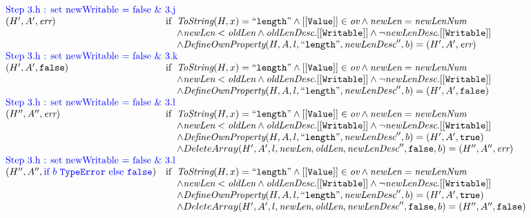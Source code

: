 \[\begin{array}{l@{}c}
{\begin{array}{ll}
\multicolumn{2}{l}{\mbox{\inblue Step 3.h : set newWritable = false \& 3.j}}\\
(H',A', \err)   &\ifc{\hf{ToString}(H, x) = ``{\tt length}" \wedge [[{\tt Value}]] \in \ov \wedge \hf{newLen} = \hf{newLenNum} \\
    \wedge \hf{newLen} < \hf{oldLen} \wedge \hf{oldLenDesc}.{\tt[[Writable]]} \wedge \neg\hf{newLenDesc}.{\tt[[Writable]]} \\
    \wedge \hf{DefineOwnProperty}(H, A, l, ``{\tt length}", \hf{newLenDesc}'', b) = (H', A', \err) }\\

\multicolumn{2}{l}{\mbox{\inblue Step 3.h : set newWritable = false \& 3.k}}\\
(H',A', \false)   &\ifc{\hf{ToString}(H, x) = ``{\tt length}" \wedge [[{\tt Value}]] \in \ov \wedge \hf{newLen} = \hf{newLenNum} \\
    \wedge \hf{newLen} < \hf{oldLen} \wedge \hf{oldLenDesc}.{\tt[[Writable]]} \wedge \neg\hf{newLenDesc}.{\tt[[Writable]]} \\
    \wedge \hf{DefineOwnProperty}(H, A, l, ``{\tt length}", \hf{newLenDesc}'', b) = (H', A', \false) }\\

\multicolumn{2}{l}{\mbox{\inblue Step 3.h : set newWritable = false \& 3.l}}\\
(H'',A'', \err)   &\ifc{\hf{ToString}(H, x) = ``{\tt length}" \wedge [[{\tt Value}]] \in \ov \wedge \hf{newLen} = \hf{newLenNum} \\
    \wedge \hf{newLen} < \hf{oldLen} \wedge \hf{oldLenDesc}.{\tt[[Writable]]} \wedge \neg\hf{newLenDesc}.{\tt[[Writable]]} \\
    \wedge \hf{DefineOwnProperty}(H, A, l, ``{\tt length}", \hf{newLenDesc}'', b) = (H', A', \true) \\
    \wedge DeleteArray(H', A',l, \hf{newLen}, \hf{oldLen}, \hf{newLenDesc}'', \false, b) = (H'', A'', \err)}\\

\multicolumn{2}{l}{\mbox{\inblue Step 3.h : set newWritable = false \& 3.l}}\\
(H'',A'', {\rejectb})   &\ifc{\hf{ToString}(H, x) = ``{\tt length}" \wedge [[{\tt Value}]] \in \ov \wedge \hf{newLen} = \hf{newLenNum} \\
    \wedge \hf{newLen} < \hf{oldLen} \wedge \hf{oldLenDesc}.{\tt[[Writable]]} \wedge \neg\hf{newLenDesc}.{\tt[[Writable]]} \\
    \wedge \hf{DefineOwnProperty}(H, A, l, ``{\tt length}", \hf{newLenDesc}'', b) = (H', A', \true) \\
    \wedge DeleteArray(H', A',l, \hf{newLen}, \hf{oldLen}, \hf{newLenDesc}'', \false, b) = (H'', A'', \false)}\\



\end{array}}
\end{array}\]
